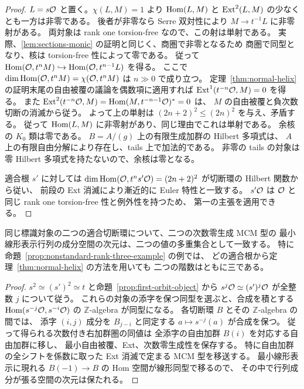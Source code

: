 \begin{proof}
$L=s\mathcal O$ と置く。$\chi(L,M)=1$ より $\operatorname{Hom}(L,M)$ と
$\operatorname{Ext}^2(L,M)$ の少なくとも一方は非零である。
後者が非零なら Serre 双対性により $M\to t^{-1}L$ に非零射がある。
両対象は rank one torsion-free なので、この射は単射である。
実際、\ref{lem:sections-monic} の証明と同じく、商圏で非零となるため
商圏で同型となり、核は torsion-free 性によって零である。
従って $\operatorname{Hom}(\mathcal O,t^n M)\hookrightarrow\operatorname{Hom}(\mathcal O,t^{n-1}L)$ を得る。
ここで $\dim\operatorname{Hom}(\mathcal O,t^n M)=\chi(\mathcal O,t^n M)$ は $n\gg0$ で成り立つ。
定理~\ref{thm:normal-helix} の証明末尾の自由被覆の議論を偶数項に適用すれば
$\operatorname{Ext}^1(t^{-n}\mathcal O,M)=0$ を得る。
また $\operatorname{Ext}^2(t^{-n}\mathcal O,M)=\operatorname{Hom}(M,t^{-n-1}\mathcal O)^*=0$ は、
$M$ の自由被覆と負次数切断の消滅から従う。
よって上の単射は $(2n+2)^2\le (2n)^2$ を与え、矛盾する。
従って $\operatorname{Hom}(L,M)$ に非零射があり、同じ理由でこれは単射である。
余核の $K_0$ 類は零である。
$B=A/(g)$ 上の有限生成加群の Hilbert 多項式は、
$A$ 上の有限自由分解により存在し、tails 上で加法的である。
非零の tails の対象は零 Hilbert 多項式を持たないので、余核は零となる。

適合根 $s'$ に対しては
$\dim\operatorname{Hom}(\mathcal O,t^n s'\mathcal O)=(2n+2)^2$ が切断環の Hilbert 関数から従い、
前段の Ext 消滅により漸近的に Euler 特性と一致する。
$s'\mathcal O$ は $\mathcal O$ と同じ rank one torsion-free 性と例外性を持つため、
第一の主張を適用できる。
\end{proof}

\begin{corollary}[異なる適合根における階数の保存]
\label{cor:first-orbit-rank-invariance}
同じ標識対象の二つの適合切断環について、二つの次数零生成 MCM 型の
最小線形表示行列の成分空間の次元は、二つの値の多重集合として一致する。
特に命題~\ref{prop:nonstandard-rank-three-example} の例では、
どの適合根から定理~\ref{thm:normal-helix} の方法を用いても
二つの階数はともに三である。
\end{corollary}
\begin{proof}
$s^2\simeq (s')^2\simeq t$ と命題~\ref{prop:first-orbit-object} から
$s^j\mathcal O\simeq(s')^j\mathcal O$ が全整数 $j$ について従う。
これらの対象の添字を保つ同型を選ぶと、合成を積とする
$\operatorname{Hom}(s^{-j}\mathcal O,s^{-i}\mathcal O)$ の $\mathbb Z$-algebra が同型になる。
各切断環 $B$ とその $\mathbb Z$-algebra の間では、
添字 $(i,j)$ 成分を $B_{j-i}$ と同定する
$a\mapsto s^{-j}(a)$ が合成を保つ。
従って得られる次数付き右加群圏の同値は
全添字の自由加群 $B(i)$ を対応する自由加群に移し、
最小自由被覆、Ext、次数零生成性を保存する。
特に自由加群の全シフトを係数に取った Ext 消滅で定まる MCM 型を移送する。
最小線形表示に現れる $B(-1)\to B$ の Hom 空間が線形同型で移るので、
その中で行列成分が張る空間の次元は保たれる。
\end{proof}

